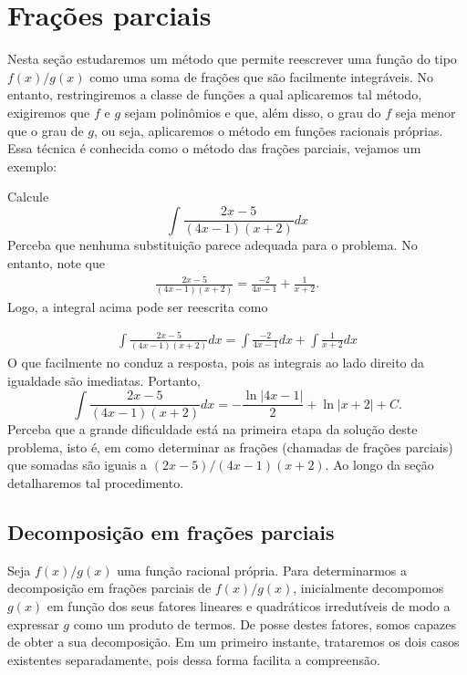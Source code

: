 \section{Frações parciais}
	
	Nesta seção estudaremos um método que permite reescrever uma função do tipo $f(x)/g(x)$ como uma soma de frações que são facilmente integráveis. No entanto, restringiremos a classe de funções a qual aplicaremos tal método, exigiremos que $f$ e $g$ sejam polinômios e que, além disso, o grau do $f$ seja menor que o grau de $g$, ou seja, aplicaremos o método em funções racionais próprias. Essa técnica é conhecida como o método das frações parciais, vejamos um exemplo:
	
	\begin{ex}
		Calcule $$\int \frac{2x - 5}{(4x-1)(x+2)}dx$$
		Perceba que nenhuma substituição parece adequada para o problema. No entanto, note que 
		\[\begin{split}
			\frac{2x - 5}{(4x-1)(x+2)} = \frac{-2}{4x-1} + \frac{1}{x+2}.
		\end{split}\]
		Logo, a integral acima pode ser reescrita como 
		
		\[\begin{split}
			\int \frac{2x - 5}{(4x-1)(x+2)}dx = \int \frac{-2}{4x-1}dx + \int \frac{1}{x+2}dx
		\end{split}\]
		O que facilmente no conduz a resposta, pois as integrais ao lado direito da igualdade são imediatas. Portanto, $$\int \frac{2x - 5}{(4x-1)(x+2)}dx = - \frac{\ln\left|4x-1\right|}{2} + \ln\left|x + 2\right| + C.$$ Perceba que a grande dificuldade está na primeira etapa da solução deste problema, isto é, em como determinar as frações (chamadas de frações parciais) que somadas são iguais a $(2x - 5)/(4x-1)(x+2)$. Ao longo da seção detalharemos tal procedimento.
	\end{ex}
	
	\subsection*{Decomposição em frações parciais}
	Seja $f(x)/g(x)$ uma função racional própria. Para determinarmos a decomposição em frações parciais de $f(x)/g(x)$, inicialmente decompomos $g(x)$ em função dos seus fatores lineares e quadráticos irredutíveis de modo a expressar $g$ como um produto de termos. De posse destes fatores, somos capazes de obter a sua decomposição. Em um primeiro instante, trataremos os dois casos existentes separadamente, pois dessa forma facilita a compreensão. 
	
